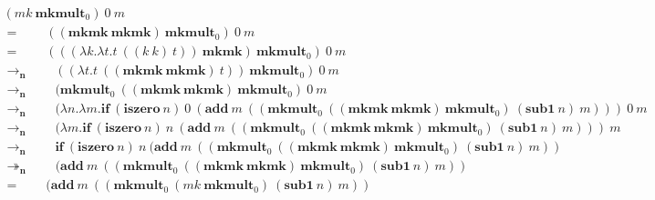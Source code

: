 \documentclass{book}
\begin{document}
$$
\begin{array}{l}
(mk\ \mathbf{mkmult}_0)\ 0\ m\\
=\qquad((\mathbf{mkmk}\ \mathbf{mkmk})\ \mathbf{mkmult}_0)\ 0\ m\\
=\qquad(((\lambda k.\lambda t.t\ ((k\ k)\ t))\ \mathbf{mkmk})\ \mathbf{mkmult}_0)\ 0\ m\\
\rightarrow_\textbf{n}\qquad((\lambda t.t\ ((\mathbf{mkmk}\ \mathbf{mkmk})\ t))\ \mathbf{mkmult}_0)\ 0\ m\\
\rightarrow_\textbf{n}\qquad(\mathbf{mkmult}_0\ ((\mathbf{mkmk}\ \mathbf{mkmk})\ \mathbf{mkmult}_0)\ 0\ m\\
\rightarrow_\textbf{n}\qquad(\lambda n.\lambda m.\mathbf{if}\ (\mathbf{iszero}\ n)\ 0\ (\mathbf{add}\ m\ ((\mathbf{mkmult}_0\ ((\mathbf{mkmk}\ \mathbf{mkmk})\ \mathbf{mkmult}_0)\ (\mathbf{sub1}\ n)\ m)))\ 0\ m\\
\rightarrow_\textbf{n}\qquad(\lambda m.\mathbf{if}\ (\mathbf{iszero}\ n)\ n\ (\mathbf{add}\ m\ ((\mathbf{mkmult}_0\ ((\mathbf{mkmk}\ \mathbf{mkmk})\ \mathbf{mkmult}_0)\ (\mathbf{sub1}\ n)\ m)))\ m\\
\rightarrow_\textbf{n}\qquad \mathbf{if}\ (\mathbf{iszero}\ n)\ n\ (\mathbf{add}\ m\ ((\mathbf{mkmult}_0\ ((\mathbf{mkmk}\ \mathbf{mkmk})\ \mathbf{mkmult}_0)\ (\mathbf{sub1}\ n)\ m))\\
\twoheadrightarrow_\textbf{n}\qquad (\mathbf{add}\ m\ ((\mathbf{mkmult}_0\ ((\mathbf{mkmk}\ \mathbf{mkmk})\ \mathbf{mkmult}_0)\ (\mathbf{sub1}\ n)\ m))\\
=\qquad (\mathbf{add}\ m\ ((\mathbf{mkmult}_0\ (mk\ \mathbf{mkmult}_0)\ (\mathbf{sub1}\ n)\ m))
\end{array}
$$
\end{document}
